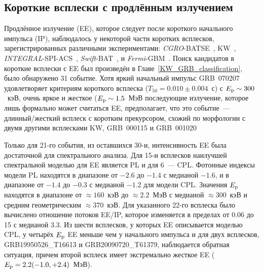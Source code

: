 \subsection{Короткие всплески с продлённым излучением}\label{sec:EE}
Продлённое излучение (EE), которое следует после короткого начального импульса (IP),
наблюдалось у некоторой части коротких всплесков, зарегистрированных различными экспериментами:
\textit{CGRO}-BATSE~\citep{Burenin_2000AstL, Norris_and_Bonnel_2006ApJ, Bostanci_2013MNRAS}, 
KW~\citep{Mazets_2002astroph, Frederiks_2004ASPC}, 
\textit{INTEGRAL}-SPI-ACS~\citep{Minaev_2010AstL}, 
\textit{Swift}-BAT~\citep{Norris_2011ApJ, Sakamoto_2011ApJS}, 
и \textit{Fermi}-GBM~\citep{Kaneko_2015MNRAS}. 
Поиск кандидатов в короткие всплески с EE был произведён в Главе~\ref{KW_GRB_classification}, 
было обнаружено 31 событие. Хотя яркий начальный импульс GRB~070207~\citep{Golenetskii_2007GCN6089}
удовлетворяет критериям короткого всплеска ($T_{50}=0.010\pm0.004$~с) с $E_{\mathrm{p}}\sim 300$~кэВ,
очень яркое и жесткое ($E_{\mathrm{p}}\sim 1.5$~МэВ последующие излучение, которое лишь формально может
считаться EE, предполагает, что это событие~--- длинный/жесткий всплеск с коротким прекурсором,
схожий по морфологии с двумя другими всплесками KW, GRB~000115 
и GRB~001020~\citep{Hurley_2000GCN859}


Только для 21-го события, из оставшихся 30-и, интенсивность EE была достаточной для спектрального анализа.
Для 15-и всплесков наилучшей спектральной моделью для EE является PL и для 6~--- CPL.   
Фотонные индексы модели PL находятся в диапазоне от $-2.6$ до $-1.4$ с медианой $-1.6$,
и в диапазоне от $-1.4$ до $-0.3$ с медианой $-1.2$ для модели CPL.
Значения $E_{\mathrm{p}}$ находятся в диапазоне от $\approx160$~кэВ до $\approx 2.2$~МэВ с медианой $\approx300$~кэВ
и средним геометрическим $\approx370$~кэВ. 
Для указанного 22-го всплеска было вычислено отношение потоков EE/IP, 
которое изменяется в пределах от 0.06 до 15 с медианой 3.3. 
Из шести всплесков, у которых EE описывается моделью CPL, у четырёх $E_{\mathrm{p}}$ EE 
меньше чем у начального импульса и для двух всплесков, GRB19950526\_T16613 и GRB20090720\_T61379, 
наблюдается обратная ситуация, причем второй всплеск имеет экстремально
жесткое EE ($E_{\mathrm{p}} = 2.2(-1.0,+2.4)$~МэВ).


